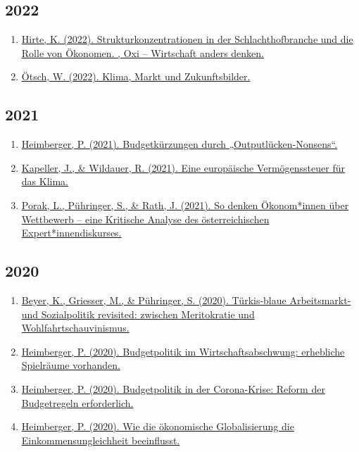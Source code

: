 \subsection*{2022}
\begin{enumerate}
	 \item \href{https://oxiblog.de/schlachthofbranche-strukturkonzentrationen-oxi122/}{Hirte, K. (2022). Strukturkonzentrationen in der Schlachthofbranche und die Rolle von Ökonomen. , Oxi -- Wirtschaft anders denken.}
	 \item \href{https://oxiblog.de/klima-markt-und-zukunftsbilder/}{Ötsch, W. (2022). Klima, Markt und Zukunftsbilder.}
\end{enumerate}
\subsection*{2021}
\begin{enumerate}
	 \item \href{https://www.awblog.at/Wirtschaft/budgetkuerzungen-durch-outputluecken-nonsens}{Heimberger, P. (2021). Budgetkürzungen durch „Outputlücken-Nonsens“.}
	 \item \href{https://www.awblog.at/Europa/europaeische-vermoegenssteuer-fuer-das-klima}{Kapeller, J., \& Wildauer, R. (2021). Eine europäische Vermögenssteuer für das Klima.}
	 \item \href{https://www.awblog.at/Wirtschaft/so-denken-oekonomen-ueber-wettbewerb}{Porak, L., Pühringer, S., \& Rath, J. (2021). So denken Ökonom*innen über Wettbewerb – eine Kritische Analyse des österreichischen Expert*innendiskurses.}
\end{enumerate}
\subsection*{2020}
\begin{enumerate}
	 \item \href{https://www.awblog.at/Allgemein/tuerkis-blaue-arbeitsmarkt-und-sozialpolitik-revisited}{Beyer, K., Griesser, M., \& Pühringer, S. (2020). Türkis-blaue Arbeitsmarkt- und Sozialpolitik revisited: zwischen Meritokratie und Wohlfahrtschauvinismus.}
	 \item \href{https://www.awblog.at/Wirtschaft/budgetpolitik-im-wirtschaftsabschwung-spielraeume}{Heimberger, P. (2020). Budgetpolitik im Wirtschaftsabschwung: erhebliche Spielräume vorhanden.}
	 \item \href{https://www.awblog.at/Europa/reform-der-budgetregeln-in-der-corona-krise-erforderlich}{Heimberger, P. (2020). Budgetpolitik in der Corona-Krise: Reform der Budgetregeln erforderlich.}
	 \item \href{https://www.awblog.at/Verteilung/oekonomische-globalisierung-und-einkommensungleichheit}{Heimberger, P. (2020). Wie die ökonomische Globalisierung die Einkommensungleichheit beeinflusst.}
\end{enumerate}
